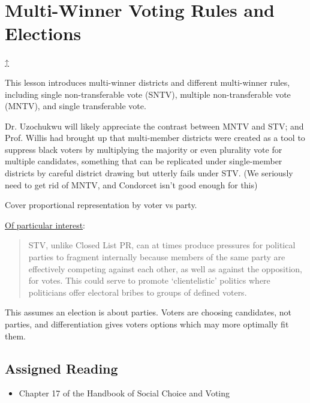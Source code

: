 \label{cur:multi-winner-voting-rules}
\section{Multi-Winner Voting Rules and Elections}\hyperref[syllabus]{↑}

This lesson introduces multi-winner districts and different multi-winner rules, including single non-transferable vote (SNTV), multiple non-transferable vote (MNTV), and single transferable vote.

\begin{boxcomment}
    Dr. Uzochukwu will likely appreciate the contrast between MNTV and STV; and Prof. Willis had brought up that multi-member districts were created as a tool to suppress black voters by multiplying the majority or even plurality vote for multiple candidates, something that can be replicated under single-member districts by careful district drawing but utterly fails under STV.  (We seriously need to get rid of MNTV, and Condorcet isn't good enough for this)
\end{boxcomment}

\begin{todo}
    Cover proportional representation by voter vs party.

    \href{https://aceproject.org/ace-en/topics/es/esd/esd02/esd02d/esd02d01}{Of particular interest}:

    \begin{quotation}
        \item STV, unlike Closed List PR, can at times produce pressures for political parties to fragment internally because members of the same party are effectively competing against each other, as well as against the opposition, for votes. This could serve to promote `clientelistic' politics where politicians offer electoral bribes to groups of defined voters.
    \end{quotation}

    This assumes an election is about parties.  Voters are choosing candidates, not parties, and differentiation gives voters options which may more optimally fit them.
\end{todo}
\subsection{Assigned Reading}

\begin{itemize}
    \item Chapter 17 of the Handbook of Social Choice and Voting \autocite[303-323]{Heckelman2015}
\end{itemize}


